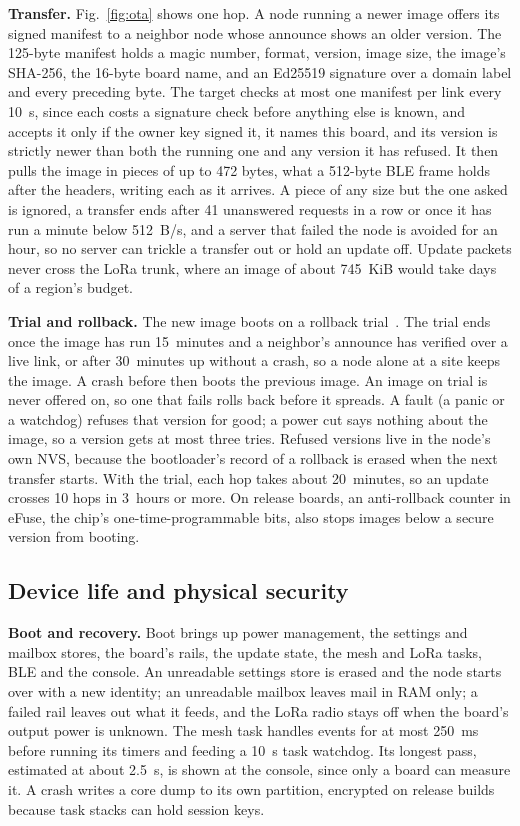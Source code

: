 \documentclass[conference]{IEEEtran}
\begin{document}
\textbf{Transfer.} Fig.~\ref{fig:ota} shows one hop. A node running a newer image offers its signed manifest to a neighbor node whose announce shows an older version. The 125-byte manifest holds a magic number, format, version, image size, the image's SHA-256, the 16-byte board name, and an Ed25519 signature over a domain label and every preceding byte. The target checks at most one manifest per link every 10~s, since each costs a signature check before anything else is known, and accepts it only if the owner key signed it, it names this board, and its version is strictly newer than both the running one and any version it has refused. It then pulls the image in pieces of up to 472 bytes, what a 512-byte BLE frame holds after the headers, writing each as it arrives. A piece of any size but the one asked is ignored, a transfer ends after 41 unanswered requests in a row or once it has run a minute below 512~B/s, and a server that failed the node is avoided for an hour, so no server can trickle a transfer out or hold an update off. Update packets never cross the LoRa trunk, where an image of about 745~KiB would take days of a region's budget.

\textbf{Trial and rollback.} The new image boots on a rollback trial~\cite{espidf_ota}. The trial ends once the image has run 15~minutes and a neighbor's announce has verified over a live link, or after 30~minutes up without a crash, so a node alone at a site keeps the image. A crash before then boots the previous image. An image on trial is never offered on, so one that fails rolls back before it spreads. A fault (a panic or a watchdog) refuses that version for good; a power cut says nothing about the image, so a version gets at most three tries. Refused versions live in the node's own NVS, because the bootloader's record of a rollback is erased when the next transfer starts. With the trial, each hop takes about 20~minutes, so an update crosses 10 hops in 3~hours or more. On release boards, an anti-rollback counter in eFuse, the chip's one-time-programmable bits, also stops images below a secure version from booting.

\subsection{Device life and physical security}
\label{sec:device}

\textbf{Boot and recovery.} Boot brings up power management, the settings and mailbox stores, the board's rails, the update state, the mesh and LoRa tasks, BLE and the console. An unreadable settings store is erased and the node starts over with a new identity; an unreadable mailbox leaves mail in RAM only; a failed rail leaves out what it feeds, and the LoRa radio stays off when the board's output power is unknown. The mesh task handles events for at most 250~ms before running its timers and feeding a 10~s task watchdog. Its longest pass, estimated at about 2.5~s, is shown at the console, since only a board can measure it. A crash writes a core dump to its own partition, encrypted on release builds because task stacks can hold session keys.
\end{document}
